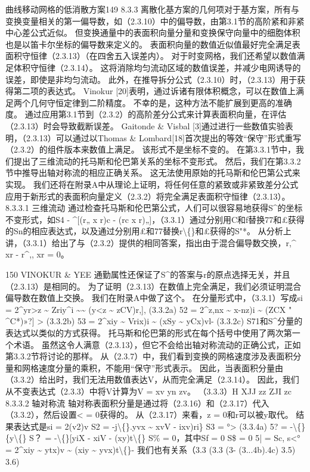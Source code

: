 \documentclass[UTF8,11pt,a4paper,openany,fontset=fandol]{ctexbook}
\begin{document}
曲线移动网格的低消散方案149 8.3.3 离散化基方案的几何项对于基方案，所有与变换变量相关的第一偏导数，如（2.3.10）中的偏导数，由第3.1节的高阶紧和非紧中心差公式近似。 但变换通量中的表面积向量分量和变换保守向量中的细胞体积也是以笛卡尔坐标的偏导数来定义的。 表面积向量的数值近似值最好完全满足表面积守恒律（2.3.13）（在四舍五入误差内）。 对于时变网格，我们还希望以数值满足体积守恒律（2.3.14）。 这将消除均匀流动区域的数值误差，并减少电网诱导的误差，即使是非均匀流动。 此外，在推导拆分公式（2.3.10）时，（2.3.13）用于获得第二项的表达式。 Vinokur [20]表明，通过诉诸有限体积概念，可以在数值上满足两个几何守恒定律到二阶精度。 不幸的是，这种方法不能扩展到更高的准确度。 通过应用第3.1节到（2.3.2）的高阶差分公式来计算表面积向量，在评估（2.3.13）时会导致截断误差。 Gaitonde \& Visbal [3]通过进行一些数值实验表明，（2.3.13）可以通过以Thomas \& Lombard[18]首次提出的等效“保守”形式重写（2.3.2）的组件版本来数值上满足。 该形式不是坐标不变的。 在第3.3.1节中，我们提出了三维流动的托马斯和伦巴第关系的坐标不变形式。 然后，我们在第3.3.2节中推导出轴对称流的相应正确关系。 这无法使用原始的托马斯和伦巴第公式来实现。 我们还将在附录A中从理论上证明，将任何任意的紧致或非紧致差分公式应用于新形式的表面积向量定义（2.3.2）将完全满足表面积守恒律（2.3.13）。 8.3.3.1 三维流动 通过检查托马斯和伦巴第公式，人们可以很容易地获得S\textasciicircum{}的坐标不变形式，如S4 - \textasciicircum{}[(r„ x r)c - (rc x r)„]，（3.3.1）通过分别用C和f替换77和£获得的Sn的相应表达式，以及通过分别用£和77替换r\textbackslash\{\}和£获得的S"*。 从分析上讲，（3.3.1）给出了与（2.3.2）提供的相同答案，指出由于混合偏导数交换，r,\textasciicircum{} xr - r\textasciicircum{},, xr = 0。

150 VINOKUR \& YEE 通勤属性还保证了S\textasciicircum{}的答案与r的原点选择无关，并且（2.3.13）是相同的。 为了证明（2.3.13）在数值上完全满足，我们必须证明混合偏导数在数值上交换。 我们在附录A中做了这个。 在分量形式中，（3.3.1）写成si = 2\textasciicircum{}yr>z \textasciitilde{} Zriy\textasciicircum{}i \textasciitilde{}\textasciitilde{} (y<z \textasciitilde{} zCV)r,], (3.3.2a) 52 = 2\textasciicircum{}z,nx \textasciitilde{} x-nz)i \textasciitilde{} (ZCX " \textasciicircum{}C*)»?] > (3.3.2b) 53 = 2\textasciicircum{}xiy \textasciitilde{} Vrix)i \textasciitilde{} (xSy \textasciitilde{} yCx)vl- (3.3.2c) S71和S\textasciicircum{}分量的表达式以类似的方式获得。 托马斯和伦巴第的形式在每个括号中使用了两次第一个术语。 虽然这令人满意（2.3.13），但它不会给出轴对称流动的正确公式，正如第3.3.2节将讨论的那样。 从（2.3.7）中，我们看到变换的网格速度涉及表面积分量和网格速度分量的乘积，不能用“保守”形式表示。 因此，当表面积分量由（3.3.2）给出时，我们无法用数值表达V，从而完全满足（2.3.14）。 因此，我们从不变表达式（2.3.3）中将V计算为V = xv yn zv。 （3.3.3）H XJJ zz ZJI zc 8.3.3.2 轴对称流 轴对称表面积分量是通过将（2.3.16）和（2.3.17）代入（3.3.2），然后设置< = 0获得的。 从（2.3.17）来看，z = 0和r可以被y取代。 结果表达式是si = 2(v2)v S2 = -j\textbackslash\{\}.yvx \textasciitilde{} xvV - ixv)ri\} S3 = °> (3.3.4a) 5? = -\textbackslash\{\}\{y\textbackslash\{\} S？ = -\textbackslash\{\}[yiX - xiV - (xy)t\textbackslash\{\} S\% = 0，其中Sf = 0 S\$ = 0 5| = Sc, s<° = 2\textasciicircum{}xiy \textasciitilde{} ytx)v \textasciitilde{} (xiy \textasciitilde{} yvx)t\textbackslash\{\}- 我们也有关系（3.3 (3.3 (3- (3...4b).4c) 3.5) 3.6)
\end{document}
